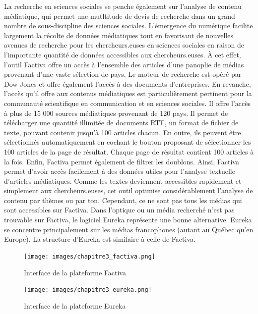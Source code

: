 \documentclass[
  letterpaper,
  DIV=11,
  numbers=noendperiod]{scrreprt}
\begin{document}
La recherche en sciences sociales se penche également sur l'analyse de
contenu médiatique, qui permet une mutltitude de devis de recherche dans
un grand nombre de sous-discipline des sciences sociales. L'émergence du
numérique facilite largement la récolte de données médiatiques tout en
favorisant de nouvelles avenues de recherche pour les chercheurs.euses
en sciences sociales en raison de l'importante quantité de données
accessibles aux chercheurs.euses. À cet effet, l'outil Factiva offre un
accès à l'ensemble des articles d'une panoplie de médias provenant d'une
vaste sélection de pays. Le moteur de recherche est opéré par Dow Jones
et offre également l'accès à des documents d'entreprises. En revanche,
l'accès qu'il offre aux contenus médiatiques est particulièrement
pertinent pour la communauté scientifique en communication et en
sciences sociales. Il offre l'accès à plus de 15 000 sources médiatiques
provenant de 120 pays. Il permet de télécharger une quantité illimitée
de documents RTF, un format de fichier de texte, pouvant contenir
jusqu'à 100 articles chacun. En outre, ils peuvent être sélectionnés
automatiquement en cochant le bouton proposant de sélectionner les 100
articles de la page de résultat. Chaque page de résultat contient 100
articles à la fois. Enfin, Factiva permet également de filtrer les
doublons. Ainsi, Factiva permet d'avoir accès facilement à des données
utiles pour l'analyse textuelle d'articles médiatiques. Comme les textes
deviennent accessibles rapidement et simplement aux chercheurs.euses,
cet outil optimise considérablement l'analyse de contenu par thèmes ou
par ton. Cependant, ce ne sont pas tous les médias qui sont accessibles
sur Factiva. Dans l'optique ou un média recherché n'est pas trouvable
sur Factiva, le logiciel Eureka représente une bonne alternative. Eureka
se concentre principalement sur les médias francophones (autant au
Québec qu'en Europe). La structure d'Eureka est similaire à celle de
Factiva.

\begin{figure}[H]

{\centering \texttt{[image: images/chapitre3\_factiva.png]}

}

\caption{Interface de la plateforme Factiva}

\end{figure}%

\begin{figure}[H]

{\centering \texttt{[image: images/chapitre3\_eureka.png]}

}

\caption{Interface de la plateforme Eureka}

\end{figure}%
\end{document}
